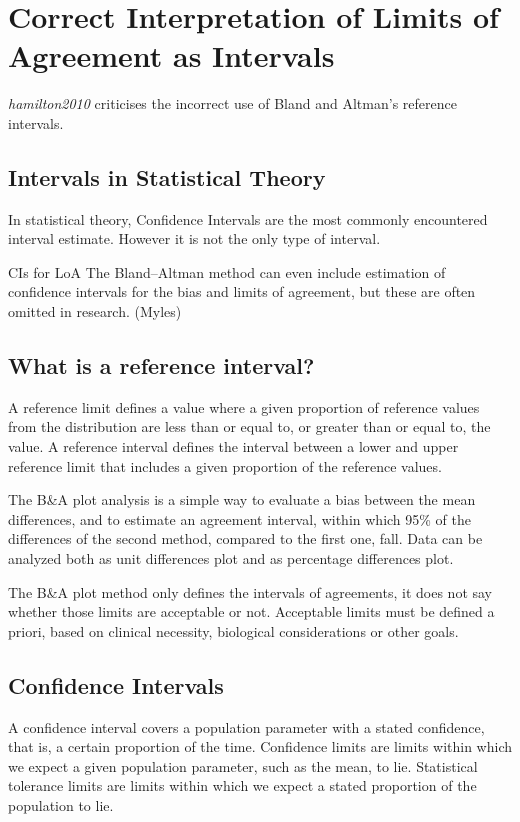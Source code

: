\documentclass[]{report}
\begin{document}
\section{Correct Interpretation of Limits of Agreement as Intervals}	
	
\textit{hamilton2010} criticises the incorrect use of Bland and Altman's reference intervals.


\subsection{Intervals in Statistical Theory}
In statistical theory, Confidence Intervals are the most commonly encountered interval estimate. However it is not the only type of interval.

CIs for LoA
The Bland–Altman method can even include estimation of confidence intervals for the bias and limits of agreement, but these are often omitted in research. (Myles)



\subsection*{What is a reference interval?}


A reference limit defines a value where a given proportion of reference values from the distribution are less than or equal to, or greater than or equal to, the value. A reference interval defines the interval between a lower and upper reference limit that includes a given proportion of the reference values.

The B\&A plot analysis is a simple way to evaluate a bias between the mean differences, and to estimate an agreement interval, within which 95\% of the differences of the second method, compared to the first one, fall. Data can be analyzed both as unit differences plot and as percentage differences plot.

The B\&A plot method only defines the intervals of agreements, it does not say whether those limits are acceptable or not. Acceptable limits must be defined a priori, based on clinical necessity, biological considerations or other goals.





\subsection{Confidence Intervals}
A confidence interval covers a population parameter with a stated confidence, that is, a certain proportion of the time.
Confidence limits are limits within which we expect a given population parameter, such as the mean, to lie. Statistical tolerance limits are limits within which we expect a stated proportion of the population to lie.
\end{document}
